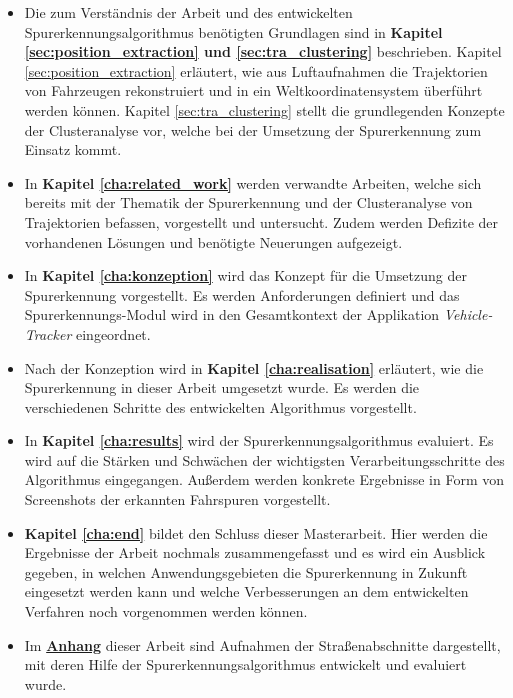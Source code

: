 \begin{itemize}
    \item Die zum Verständnis der Arbeit und des entwickelten Spurerkennungsalgorithmus benötigten
            Grundlagen sind in \textbf{Kapitel \ref{sec:position_extraction} und \ref{sec:tra_clustering}} beschrieben.
            Kapitel \ref{sec:position_extraction} erläutert, wie aus Luftaufnahmen die Trajektorien von Fahrzeugen
            rekonstruiert und in ein Weltkoordinatensystem überführt werden können.
            Kapitel \ref{sec:tra_clustering} stellt die grundlegenden Konzepte der Clusteranalyse vor, welche
            bei der Umsetzung der Spurerkennung zum Einsatz kommt.
    \item In \textbf{Kapitel \ref{cha:related_work}} werden verwandte Arbeiten, welche sich bereits mit
            der Thematik der Spurerkennung und der Clusteranalyse von Trajektorien befassen, vorgestellt und untersucht.
            Zudem werden Defizite der vorhandenen Lösungen und benötigte Neuerungen aufgezeigt.
    \item In \textbf{Kapitel \ref{cha:konzeption}} wird das Konzept für die Umsetzung der Spurerkennung vorgestellt.
            Es werden Anforderungen definiert und das Spurerkennungs-Modul wird in den Gesamtkontext
            der Applikation \textit{Vehicle-Tracker} eingeordnet.
    \item Nach der Konzeption wird in \textbf{Kapitel \ref{cha:realisation}} erläutert, wie die Spurerkennung in dieser Arbeit
            umgesetzt wurde. Es werden die verschiedenen Schritte des entwickelten Algorithmus vorgestellt.
    \item In \textbf{Kapitel \ref{cha:results}} wird der Spurerkennungsalgorithmus evaluiert.
            Es wird auf die Stärken und Schwächen der wichtigsten Verarbeitungsschritte des Algorithmus eingegangen.
            Außerdem werden konkrete Ergebnisse in Form von Screenshots der erkannten Fahrspuren vorgestellt.
    \item \textbf{Kapitel \ref{cha:end}} bildet den Schluss dieser Masterarbeit. Hier werden die Ergebnisse der
            Arbeit nochmals zusammengefasst und es wird ein Ausblick gegeben, in welchen Anwendungsgebieten die Spurerkennung
            in Zukunft eingesetzt werden kann und welche Verbesserungen an dem entwickelten Verfahren noch vorgenommen werden können.
    \item Im \textbf{\hyperref[cha:anhang_a]{Anhang}} dieser Arbeit sind Aufnahmen der Straßenabschnitte dargestellt,
            mit deren Hilfe der Spurerkennungsalgorithmus entwickelt und evaluiert wurde.
\end{itemize}

